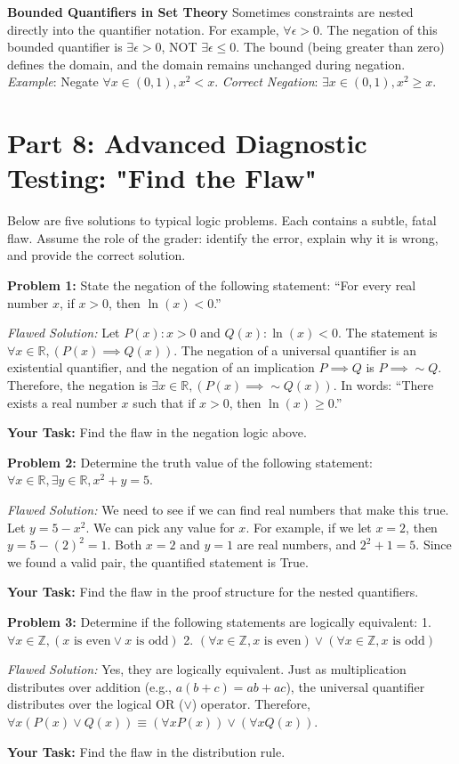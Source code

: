 \documentclass[12pt]{article}
\begin{document}
\textbf{Bounded Quantifiers in Set Theory}
Sometimes constraints are nested directly into the quantifier notation. For example, $\forall \epsilon > 0$. The negation of this bounded quantifier is $\exists \epsilon > 0$, NOT $\exists \epsilon \le 0$. The bound (being greater than zero) defines the domain, and the domain remains unchanged during negation.
\textit{Example}: Negate $\forall x \in (0,1), x^2 < x$.
\textit{Correct Negation}: $\exists x \in (0,1), x^2 \ge x$.

\section{Part 8: Advanced Diagnostic Testing: "Find the Flaw"}

Below are five solutions to typical logic problems. Each contains a subtle, fatal flaw. Assume the role of the grader: identify the error, explain why it is wrong, and provide the correct solution.

\textbf{Problem 1:} State the negation of the following statement: ``For every real number $x$, if $x > 0$, then $\ln(x) < 0$.''
\begin{mdframed}
\textit{Flawed Solution:} 
Let $P(x): x > 0$ and $Q(x): \ln(x) < 0$.
The statement is $\forall x \in \mathbb{R}, (P(x) \implies Q(x))$.
The negation of a universal quantifier is an existential quantifier, and the negation of an implication $P \implies Q$ is $P \implies \sim Q$.
Therefore, the negation is $\exists x \in \mathbb{R}, (P(x) \implies \sim Q(x))$.
In words: ``There exists a real number $x$ such that if $x > 0$, then $\ln(x) \ge 0$.''
\end{mdframed}
\textbf{Your Task:} Find the flaw in the negation logic above.

\vspace{0.5cm}
\textbf{Problem 2:} Determine the truth value of the following statement: $\forall x \in \mathbb{R}, \exists y \in \mathbb{R}, x^2 + y = 5$.
\begin{mdframed}
\textit{Flawed Solution:} 
We need to see if we can find real numbers that make this true. Let $y = 5 - x^2$. We can pick any value for $x$. For example, if we let $x = 2$, then $y = 5 - (2)^2 = 1$. Both $x=2$ and $y=1$ are real numbers, and $2^2 + 1 = 5$. Since we found a valid pair, the quantified statement is True.
\end{mdframed}
\textbf{Your Task:} Find the flaw in the proof structure for the nested quantifiers.

\vspace{0.5cm}
\textbf{Problem 3:} Determine if the following statements are logically equivalent:
1. $\forall x \in \mathbb{Z}, (x \text{ is even} \lor x \text{ is odd})$
2. $(\forall x \in \mathbb{Z}, x \text{ is even}) \lor (\forall x \in \mathbb{Z}, x \text{ is odd})$
\begin{mdframed}
\textit{Flawed Solution:} 
Yes, they are logically equivalent. Just as multiplication distributes over addition (e.g., $a(b+c) = ab+ac$), the universal quantifier distributes over the logical OR ($\lor$) operator. Therefore, $\forall x (P(x) \lor Q(x)) \equiv (\forall x P(x)) \lor (\forall x Q(x))$.
\end{mdframed}
\textbf{Your Task:} Find the flaw in the distribution rule.
\end{document}
